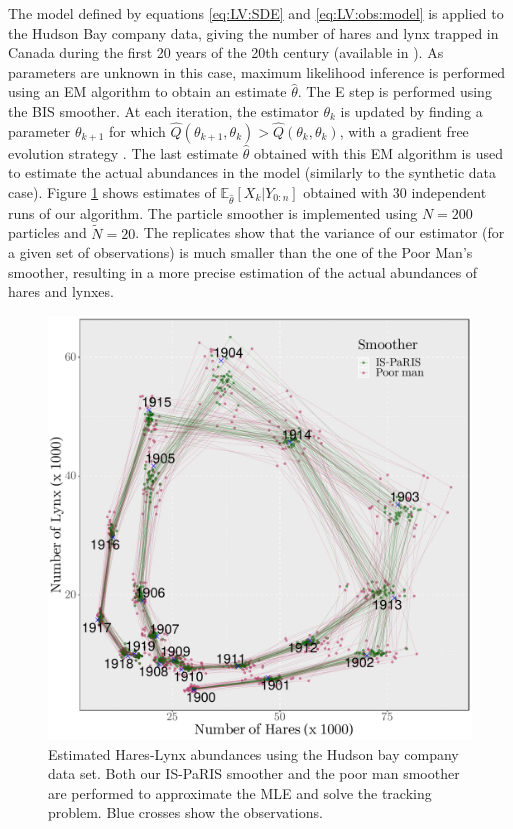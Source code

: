 \documentclass[12pt]{article}
\def\pE{\mathbb{E}}
\begin{document}

The model defined by equations \eqref{eq:LV:SDE} and \eqref{eq:LV:obs:model} is applied to the Hudson Bay company data, giving the number of hares and lynx trapped in Canada during the first 20 years of the 20th century (available in \cite{odum1971fundamentals}). 
As parameters are unknown in this case, maximum likelihood inference is performed using an EM \cite{dempster1977maximum} algorithm to obtain an estimate $\hat{\theta}$.
The E step is performed using the BIS smoother.
At each iteration, the estimator $\theta_k$ is updated by finding a parameter $\theta_{k+1}$ for which $\hat Q(\theta_{k+1},\theta_k) >  \hat Q(\theta_k,\theta_k)$, with  a gradient free evolution strategy \cite{hansen2006cma}. 
The last estimate $\hat{\theta}$ obtained with this EM algorithm  is used to  estimate the actual abundances in the model (similarly to the synthetic data case). 
Figure \ref{fig:LV:hares:lynx} shows  estimates of $\pE_{\hat{\theta}}\left[ X_k \vert Y_{0:n}\right]$ obtained with 30 independent runs of our algorithm. 
The particle smoother is implemented using $N = 200$ particles and $\tilde{N}=20$. 
The replicates show that the variance of our estimator (for a given set of observations) is much smaller than the one of the Poor Man's smoother, resulting in a more precise estimation of the actual abundances of hares and lynxes.

\begin{figure}
\begin{center}
\includegraphics[width = .45\textwidth]{Figure7.pdf}
\end{center}
\caption{\label{fig:LV:hares:lynx} Estimated Hares-Lynx abundances using the Hudson bay company data set. Both our IS-PaRIS smoother and the poor man smoother are performed to approximate the MLE and solve the tracking problem. Blue crosses show the observations.}
\end{figure} 
\end{document}
